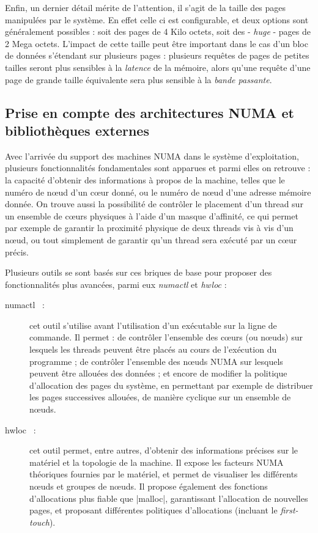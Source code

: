 Enfin, un dernier détail mérite de l'attention, il s'agit de la taille des pages manipulées par le système.
En effet celle ci est configurable, et deux options sont généralement possibles : soit des pages de 4 Kilo octets, soit des - \emph{huge} - pages de 2 Mega octets.
L'impact de cette taille peut être important dans le cas d'un bloc de données s'étendant sur plusieurs pages : plusieurs requêtes de pages de petites tailles seront plus sensibles à la \emph{latence} de la mémoire, alors qu'une requête d'une page de grande taille équivalente sera plus sensible à la \emph{bande passante}.

\subsection{Prise en compte des architectures NUMA et bibliothèques externes}

Avec l'arrivée du support des machines NUMA dans le système d'exploitation, plusieurs fonctionnalités fondamentales sont apparues et parmi elles on retrouve : la capacité d'obtenir des informations à propos de la machine, telles que le numéro de nœud d'un cœur donné, ou le numéro de nœud d'une adresse mémoire donnée.
On trouve aussi la possibilité de contrôler le placement d'un thread sur un ensemble de cœurs physiques à l'aide d'un masque d'affinité, ce qui permet par exemple de garantir la proximité physique de deux threads vis à vis d'un nœud, ou tout simplement de garantir qu'un thread sera exécuté par un cœur précis.

Plusieurs outils se sont basés sur ces briques de base pour proposer des fonctionnalités plus avancées, parmi eux \emph{numactl} et \emph{hwloc} :

\begin{description}
  \item [numactl~\cite{numactl} :] cet outil s'utilise avant l'utilisation d'un exécutable sur la ligne de commande. Il permet : de contrôler l'ensemble des cœurs (ou nœuds) sur lesquels les threads peuvent être placés au cours de l'exécution du programme ;
    de contrôler l'ensemble des nœuds NUMA sur lesquels peuvent être allouées des données ;
    et encore de modifier la politique d'allocation des pages du système, en permettant par exemple de distribuer les pages successives allouées, de manière cyclique sur un ensemble de nœuds.
  \item [hwloc~\cite{Broquedis2010} :] cet outil permet, entre autres, d'obtenir des informations précises sur le matériel et la topologie de la machine. Il expose les facteurs NUMA théoriques fournies par le matériel, et permet de visualiser les différents nœuds et groupes de nœuds.
  Il propose également des fonctions d'allocations plus fiable que |malloc|, garantissant l'allocation de nouvelles pages, et proposant différentes politiques d'allocations (incluant le \emph{first-touch}).
\end{description}


